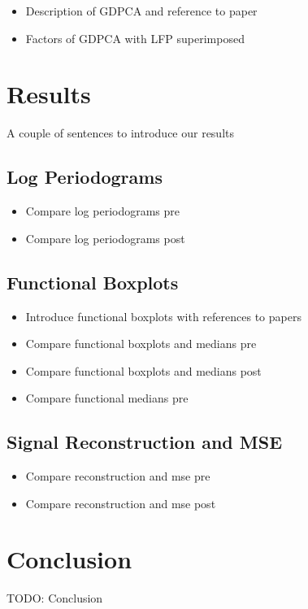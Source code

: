 \documentclass[12pt]{article}
\begin{document}
\begin{itemize}
\item  Description of GDPCA and reference to paper
\item Factors of GDPCA with LFP superimposed
\end{itemize}



\section{Results} \label{sec:results}
A couple of sentences to introduce our results

\subsection{Log Periodograms} \label{sec:lp}
\begin{itemize}
\item Compare log periodograms pre
\item Compare log periodograms post
\end{itemize}

\subsection{Functional Boxplots} \label{sec:fb}
\begin{itemize}
\item Introduce functional boxplots with references to papers
\item Compare functional boxplots and medians pre
\item Compare functional boxplots and medians post
\item Compare functional medians pre
\end{itemize}


\subsection{Signal Reconstruction and MSE} \label{sec:mse}
\begin{itemize}
\item Compare reconstruction and mse pre
\item Compare reconstruction and mse post
\end{itemize}



\section{Conclusion} \label{sec:conclusion}
TODO: Conclusion



\end{document}
